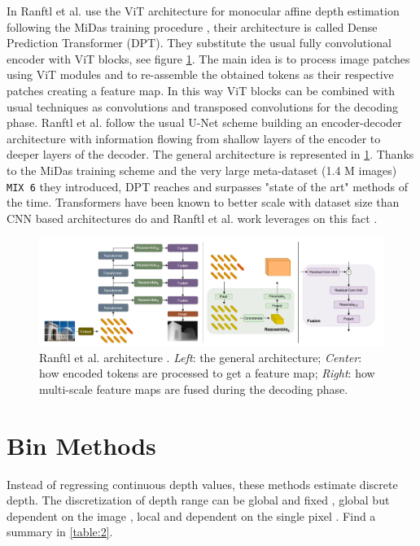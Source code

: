 In \cite{denseViT} Ranftl et al. use the ViT \cite{ViT} architecture for monocular affine depth estimation following the MiDas training procedure \cite{MiDas}, their architecture is called Dense Prediction Transformer (DPT).
They substitute the usual fully convolutional encoder with ViT blocks, see figure \ref{fig:denseViT_architecture}.
The main idea is to process image patches using ViT modules and to re-assemble the obtained tokens as their respective patches creating a feature map.
In this way ViT blocks can be combined with usual techniques as convolutions and transposed convolutions for the decoding phase.
Ranftl et al. follow the usual U-Net \cite{UNet} scheme building an encoder-decoder architecture with information flowing from shallow layers of the encoder to deeper layers of the decoder.
The general architecture is represented in \ref{fig:denseViT_architecture}.
Thanks to the MiDas \cite{MiDas} training scheme and the very large meta-dataset (1.4 M images) \texttt{MIX 6} they introduced, DPT reaches and surpasses "state of the art" methods of the time.
Transformers have been known to better scale with dataset size than CNN based architectures do and Ranftl et al. work leverages on this fact \cite{ViT}.

\begin{figure}
\centering
\includegraphics[scale=0.3]{figs/denseViT_architecture}
\caption{Ranftl et al. architecture \cite{denseViT}. \textit{Left}: the general architecture; \textit{Center}: how encoded tokens are processed to get a feature map; \textit{Right}: how multi-scale feature maps are fused during the decoding phase. \label{fig:denseViT_architecture}}
\end{figure}

\section{Bin Methods}
Instead of regressing continuous depth values, these methods estimate discrete depth.
The discretization of depth range can be global and fixed \cite{depth_as_classification, ordinal_regression}, global but dependent on the image \cite{AdaBins}, local and dependent on the single pixel \cite{ZoeDepth}.
Find a summary in \ref{table:2}.


